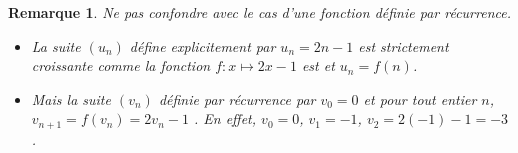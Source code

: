 \documentclass{beamer}
\newtheorem{remark}[theorem]{Remarque}
\begin{document}
\begin{frame}
\begin{remark}
 Ne pas confondre avec le cas d'une fonction définie par récurrence.
 \begin{itemize}
  \item La suite $(u_n)$ défine explicitement par $u_n=2n-1$ est strictement croissante comme la fonction 
 $f:x \mapsto 2x-1$ est  et $u_n=f(n)$.
 \item Mais la suite $(v_n)$ définie par récurrence par $v_0=0$ et pour tout entier $n$, $v_{n+1}=f(v_n)=2 v_n-1$ 
 . En effet, $v_0=0$, $v_1=-1$, $v_2=2(-1)-1=-3$. 
 \end{itemize}
\end{remark}
\end{frame} 
\end{document}
